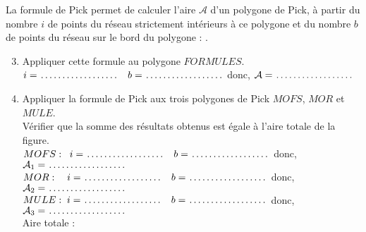 \begin{enigme}
        \vspace*{-5mm}
        La formule de Pick permet de calculer l'aire $\mathcal{A}$ d'un polygone de Pick, à partir du nombre $i$ de points du réseau strictement intérieurs à ce polygone et du nombre $b$ de points du réseau sur le bord du polygone : . 
        \begin{enumerate}
        \setcounter{enumi}{2}
            \item Appliquer cette formule au polygone $FORMULES$. \\ [3mm]
                $i =\makebox[0.23\linewidth]{\dotfill} \quad b =\makebox[0.23\linewidth]{\dotfill}$ \quad donc, $\mathcal{A} = \makebox[0.23\linewidth]{\dotfill}$ \\
            \item Appliquer la formule de Pick aux trois polygones de Pick $MOFS$, $MOR$ et $MULE$. \\
            Vérifier que la somme des résultats obtenus est égale à l'aire totale de la figure. \\ [3mm]
            $MOFS : \;\; i =\makebox[0.23\linewidth]{\dotfill} \quad b =\makebox[0.23\linewidth]{\dotfill}$ \quad donc, $\mathcal{A}_1 = \makebox[0.23\linewidth]{\dotfill}$ \\ [3mm]
            $MOR : \quad i =\makebox[0.23\linewidth]{\dotfill} \quad b =\makebox[0.23\linewidth]{\dotfill}$ \quad donc, $\mathcal{A}_2 = \makebox[0.23\linewidth]{\dotfill}$ \\ [3mm]
            $MULE : \; i =\makebox[0.23\linewidth]{\dotfill} \quad b =\makebox[0.23\linewidth]{\dotfill}$ \quad donc, $\mathcal{A}_3 = \makebox[0.23\linewidth]{\dotfill}$ \\ [3mm]
            Aire totale : \dotfill
        \end{enumerate}
\end{enigme}  
%     
